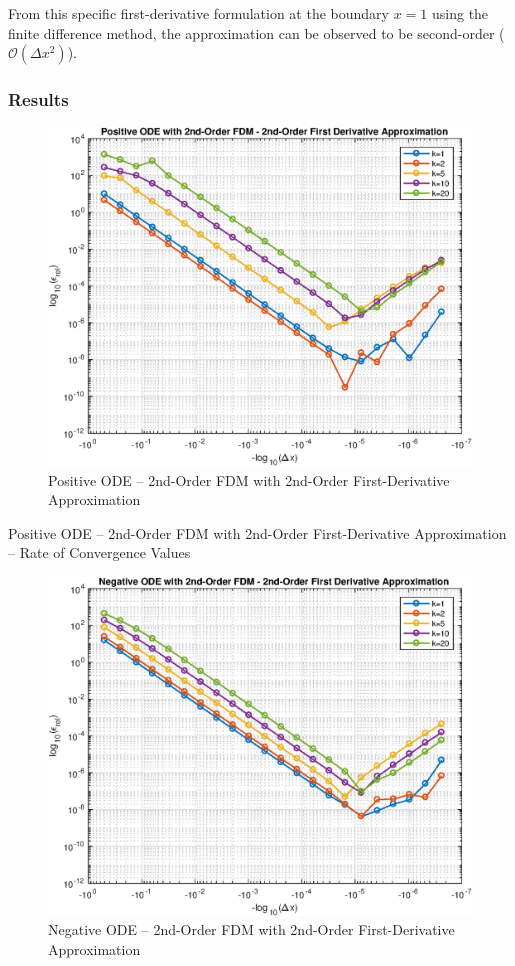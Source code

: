 \documentclass[10pt, reqno]{article}		%
\numberwithin{equation}{section}
\begin{document}
From this specific first-derivative formulation at the boundary $x = 1$ using the finite difference method, the approximation can be observed to be second-order ($\mathcal{O}(\Delta x^2)$).

\newpage

\subsubsection{Results}

\begin{figure}[H]
	\begin{center}
		\includegraphics[width = 0.73\linewidth]{positive_ode_order_2_fd_order_2}
		\caption{Positive ODE -- 2nd-Order FDM with 2nd-Order First-Derivative Approximation}	
	\end{center}
\end{figure}

\vfill

\begin{table}[H]
	
	\caption{Positive ODE -- 2nd-Order FDM with 2nd-Order First-Derivative Approximation -- Rate of Convergence Values}	
\end{table}\begin{figure}[H]
	
	\begin{center}
		\includegraphics[width = 0.76\linewidth]{negative_ode_order_2_fd_order_2}
		\caption{Negative ODE -- 2nd-Order FDM with 2nd-Order First-Derivative Approximation}	
	\end{center}
\end{figure}
\end{document}
